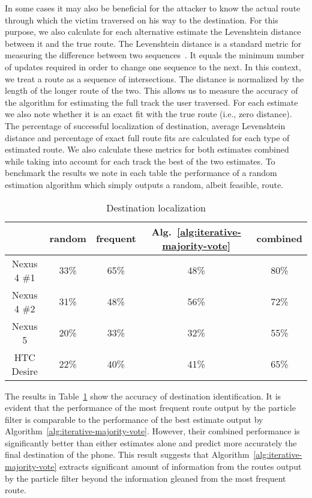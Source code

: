 In some cases it may also be beneficial for the attacker to know the actual route through which the victim traversed on his way to the destination.
For this purpose, we also calculate for each alternative estimate the Levenshtein distance between it and the true route. The Levenshtein distance is a standard metric for measuring the difference between two sequences~\cite{levenshtein1966binary}. It equals the minimum number of updates required in order to change one sequence to the next.
In this context, we treat a route as a sequence of intersections.
The distance is normalized by the length of the longer route of the two. This allows us to measure the accuracy of the algorithm for estimating the full track the user traversed.
For each estimate we also note whether it is an exact fit with the true route (i.e., zero distance).
The percentage of successful localization of destination, average Levenshtein distance and percentage of exact full route fits are calculated for each type of estimated route.
We also calculate these metrics for both estimates combined while taking into account for each track the best of the two estimates.
To benchmark the results we note in each table the performance of a random estimation algorithm which simply outputs a random, albeit feasible, route.


\begin{table}
	\centering
	\small
		\begin{tabular}{c|c|c|c|c|}
			\cline{2-5}
			& random & frequent & Alg.~\ref{alg:iterative-majority-vote} & combined \\
			\hline
			\multicolumn{1}{|c|}{Nexus 4 \#1} & 33\% & 65\% & 48\% & 80\% \\
			\hline
			\multicolumn{1}{|c|}{Nexus 4 \#2} & 31\% & 48\% & 56\% & 72\% \\
			\hline
			\multicolumn{1}{|c|}{Nexus 5} & 20\% & 33\% & 32\% & 55\% \\
			\hline
			\multicolumn{1}{|c|}{HTC Desire} & 22\% & 40\% & 41\% & 65\% \\
			\hline
		\end{tabular}
		\normalsize
	\caption{Destination localization}
	\label{tab:DestinationLocalization}
\end{table}

The results in Table~\ref{tab:DestinationLocalization} show the accuracy of destination identification. It is evident that the performance of the most frequent
route output by the particle filter is comparable to the performance of the best estimate output by
Algorithm~\ref{alg:iterative-majority-vote}.
However, their combined performance is significantly better than either estimates alone and predict more accurately the final destination of the phone.
This result suggests that Algorithm~\ref{alg:iterative-majority-vote} extracts significant amount of information from
the routes output by the particle filter beyond the information gleaned from the most frequent route.

